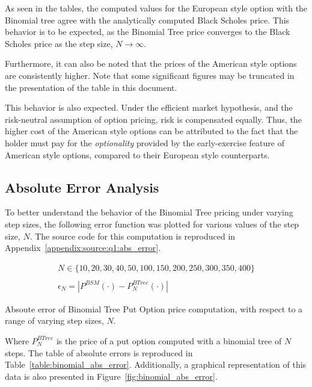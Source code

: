 \documentclass[10pt]{article}
\begin{document}
    As seen in the tables, the computed values for the European style option with the Binomial tree agree with the analytically computed Black Scholes price. This behavior is to be expected, as the Binomial Tree price converges to the Black Scholes price as the step size, $N \rightarrow \infty$.

    Furthermore, it can also be noted that the prices of the American style options are consistently higher. Note that some significant figures may be truncated in the presentation of the table in this document.
    
    This behavior is also expected. Under the efficient market hypothesis, and the risk-neutral assumption of option pricing, risk is compensated equally. Thus, the higher cost of the American style options can be attributed to the fact that the holder must pay for the \textit{optionality} provided by the early-exercise feature of American style options, compared to their European style counterparts.


    \subsection{Absolute Error Analysis}
    
    To better understand the behavior of the Binomial Tree pricing under varying step sizes, the following error function was plotted for various values of the step size, $N$. The source code for this computation is reproduced in Appendix~\ref{appendix:source:q1:abs_error}.

    \begin{gather*}
        N \in \{10, 20, 30, 40, 50, 100, 150, 200, 250, 300, 350, 400\} \\
        \\
        \epsilon_N = \left| P^{BSM}(\cdot) - P^{BTree}_N(\cdot) \right|
    \end{gather*}

    \begin{table}[!h]
        \centering
        \caption{Absoute error of Binomial Tree Put Option price computation, with respect to a range of varying step sizes, $N$.}
        \label{table:binomial_abs_error}
    \end{table}

    Where $P^{BTree}_N$ is the price of a put option computed with a binomial tree of $N$ steps. The table of absolute errors is reproduced in Table~\ref{table:binomial_abs_error}. Additionally, a graphical representation of this data is also presented in Figure~\ref{fig:binomial_abs_error}.
\end{document}
